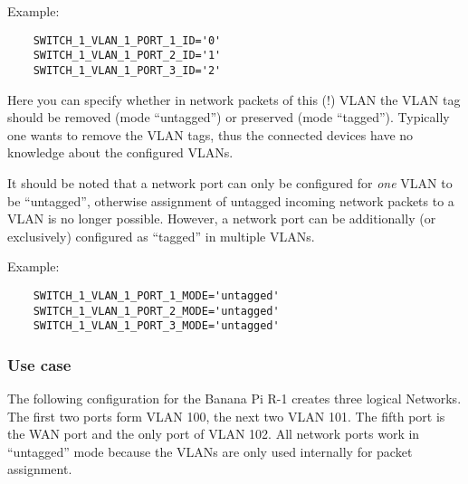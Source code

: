 \begin{description}
Example:

\begin{example}
\begin{verbatim}
    SWITCH_1_VLAN_1_PORT_1_ID='0'
    SWITCH_1_VLAN_1_PORT_2_ID='1'
    SWITCH_1_VLAN_1_PORT_3_ID='2'
\end{verbatim}
\end{example}


Here you can specify whether in network packets of this (!) VLAN the
VLAN tag should be removed (mode ``untagged'') or preserved (mode ``tagged''). 
Typically one wants to remove the VLAN tags, thus the connected devices have 
no knowledge about the configured VLANs.

It should be noted that a network port can only be configured for \emph{one} 
VLAN to be ``untagged'', otherwise assignment of untagged incoming network 
packets to a VLAN is no longer possible. However, a network port can be
additionally (or exclusively) configured as ``tagged'' in multiple VLANs.

Example:

\begin{example}
\begin{verbatim}
    SWITCH_1_VLAN_1_PORT_1_MODE='untagged'
    SWITCH_1_VLAN_1_PORT_2_MODE='untagged'
    SWITCH_1_VLAN_1_PORT_3_MODE='untagged'
\end{verbatim}
\end{example}

\end{description}

\subsubsection{Use case}

The following configuration for the Banana Pi R-1 creates three logical
Networks. The first two ports form VLAN 100, the next two VLAN
101. The fifth port is the WAN port and the only port of VLAN 102. All
network ports work in ``untagged'' mode because the VLANs are only used 
internally for packet assignment.

